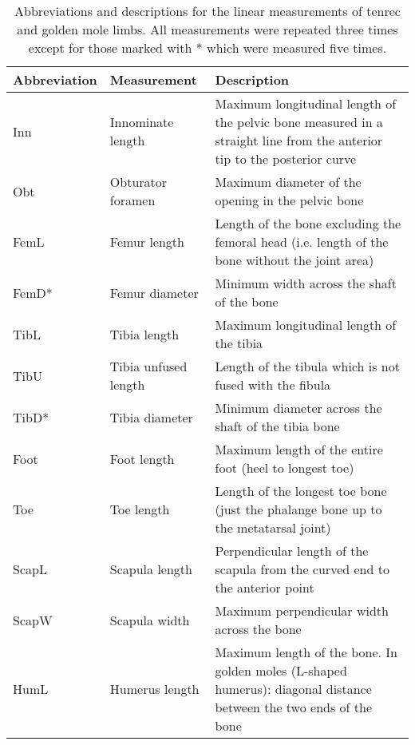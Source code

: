 \begin{center}
\begin{longtable} {p{} p{} p{}}
\caption[Limb measurements] {Abbreviations and descriptions for the linear measurements of tenrec and golden mole limbs. All measurements were repeated three times except for those marked with * which were measured five times.} \\

\hline
\textbf{Abbreviation} & \textbf{Measurement} & \textbf{Description}\\
\hline
Inn & Innominate length & Maximum longitudinal length of the pelvic bone measured in a straight line from the anterior tip to the posterior curve\\ 
Obt & Obturator foramen & Maximum diameter of the opening in the pelvic bone\\
FemL & Femur length & Length of the bone excluding the femoral head (i.e. length of the bone without the joint area)\\
FemD* & Femur diameter & Minimum width across the shaft of the bone\\
TibL & Tibia length & Maximum longitudinal length of the tibia\\
TibU & Tibia unfused length & Length of the tibula which is not fused with the fibula\\
TibD* & Tibia diameter & Minimum diameter across the shaft of the tibia bone\\
Foot & Foot length & Maximum length of the entire foot (heel to longest toe)\\
Toe & Toe length & Length of the longest toe bone (just the phalange bone up to the metatarsal joint)\\
ScapL & Scapula length & Perpendicular length of the scapula from the curved end to the anterior point\\
ScapW & Scapula width & Maximum perpendicular width across the bone\\
HumL & Humerus length & Maximum length of the bone. In golden moles (L-shaped humerus): diagonal distance between the two ends of the bone\\

\end{longtable}
\end{center}

